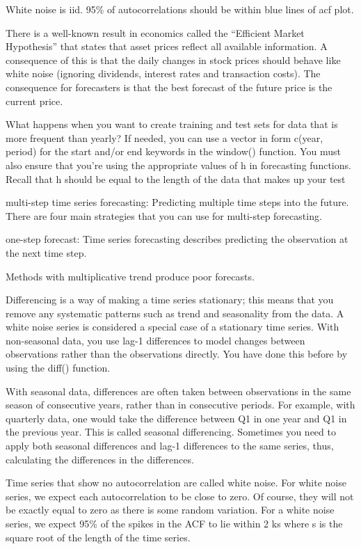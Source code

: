\documentclass[]{book}
\begin{document}
White noise is iid. 95\% of autocorrelations should be within blue lines of acf plot.

There is a well-known result in economics called the ``Efficient Market Hypothesis'' that states that asset prices reflect all available information. A consequence of this is that the daily changes in stock prices should behave like white noise (ignoring dividends, interest rates and transaction costs). The consequence for forecasters is that the best forecast of the future price is the current price.

What happens when you want to create training and test sets for data that is more frequent than yearly? If needed, you can use a vector in form c(year, period) for the start and/or end keywords in the window() function. You must also ensure that you're using the appropriate values of h in forecasting functions. Recall that h should be equal to the length of the data that makes up your test

multi-step time series forecasting: Predicting multiple time steps into the future. There are four main strategies that you can use for multi-step forecasting.

one-step forecast: Time series forecasting describes predicting the observation at the next time step.

Methods with multiplicative trend produce poor forecasts.

Differencing is a way of making a time series stationary; this means that you remove any systematic patterns such as trend and seasonality from the data. A white noise series is considered a special case of a stationary time series. With non-seasonal data, you use lag-1 differences to model changes between observations rather than the observations directly. You have done this before by using the diff() function.

With seasonal data, differences are often taken between observations in the same season of consecutive years, rather than in consecutive periods. For example, with quarterly data, one would take the difference between Q1 in one year and Q1 in the previous year. This is called seasonal differencing. Sometimes you need to apply both seasonal differences and lag-1 differences to the same series, thus, calculating the differences in the differences.

Time series that show no autocorrelation are called white noise. For white noise series, we expect each autocorrelation to be close to zero. Of course, they will not be exactly equal to zero as there is some random variation. For a white noise series, we expect 95\% of the spikes in the ACF to lie within 2 ks where s is the square root of the length of the time series.
\end{document}
